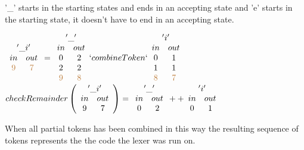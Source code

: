 \begin{example}\label{remToken}
'\_' starts in the starting states and ends in an accepting state and 'e' starts
in the starting state, it doesn't have to end in an accepting state.
\begin{center}
$\begin{array}{cc}\multicolumn{2}{c}{'\_i'}\\
in & out\\
\textcolor{brown}{9} & \textcolor{brown}{7}\\
\end{array}
=
\begin{array}{cc}\multicolumn{2}{c}{'\_'}\\
in & out\\
0 & 2\\
2 & 2\\
\textcolor{brown}{9} & \textcolor{brown}{8}\\
\end{array}
`combineToken`
\begin{array}{cc}
\multicolumn{2}{c}{'i'}\\
in & out\\
0 & 1\\
1 & 1\\
\textcolor{brown}{8} & \textcolor{brown}{7}\\
\end{array}$\\
$checkRemainder \left(\begin{array}{cc}\multicolumn{2}{c}{'\_i'}\\
in & out\\
9 & 7\\
\end{array} \right)
=
\begin{array}{cc}\multicolumn{2}{c}{'\_'}\\
in & out\\
0 & 2\\
\end{array} ++
\begin{array}{cc}\multicolumn{2}{c}{'i'}\\
in & out\\
0 & 1\\
\end{array}$\\
\end{center}
\end{example}
When all partial tokens has been combined in this way the resulting sequence of
tokens represents the the code the lexer was run on.


